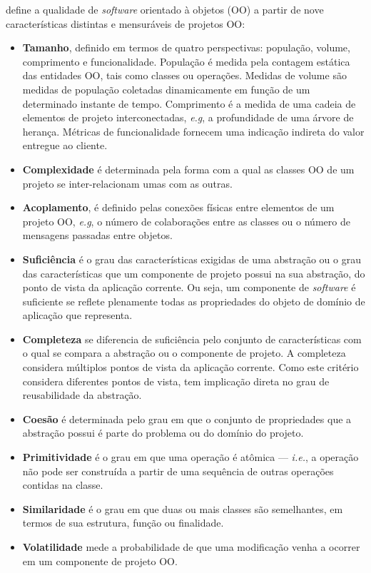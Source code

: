  define a qualidade de \textit{software} orientado à objetos (OO) a partir de nove características distintas e mensuráveis de projetos OO:

\begin{itemize}
	\item \textbf{Tamanho}, definido em termos de quatro perspectivas: população, volume, comprimento e funcionalidade. População é medida pela contagem estática das entidades OO, tais como classes ou operações. Medidas de volume são medidas de população coletadas dinamicamente em função de um determinado instante de tempo. Comprimento é a medida de uma cadeia de elementos de projeto interconectadas, \textit{e.g}, a profundidade de uma árvore de herança. Métricas de funcionalidade fornecem uma indicação indireta do valor entregue ao cliente.
	\item \textbf{Complexidade} é determinada pela forma com a qual as classes OO de um projeto se inter-relacionam umas com as outras.
	\item \textbf{Acoplamento}, é definido pelas conexões físicas entre elementos de um projeto OO, \textit{e.g}, o número de colaborações entre as classes ou o número de mensagens passadas entre objetos.
	\item \textbf{Suficiência} é o grau das características exigidas de uma abstração ou o grau das características que um componente de projeto possui na sua abstração, do ponto de vista da aplicação corrente. Ou seja, um componente de \textit{software} é suficiente se reflete plenamente todas as propriedades do objeto de domínio de aplicação que representa.
	\item \textbf{Completeza} se diferencia de suficiência pelo conjunto de características com o qual se compara a abstração ou o componente de projeto. A completeza considera múltiplos pontos de vista da aplicação corrente. Como este critério considera diferentes pontos de vista, tem implicação direta no grau de reusabilidade da abstração.
	\item \textbf{Coesão} é determinada pelo grau em que o conjunto de propriedades que a abstração possui é parte do problema ou do domínio do projeto.
	\item \textbf{Primitividade} é o grau em que uma operação é atômica --- \textit{i.e.}, a operação não pode ser construída a partir de uma sequência de outras operações contidas na classe.
	\item \textbf{Similaridade} é o grau em que duas ou mais classes são semelhantes, em termos de sua estrutura, função ou finalidade.
	\item \textbf{Volatilidade} mede a probabilidade de que uma modificação venha a ocorrer em um componente de projeto OO.
\end{itemize}

